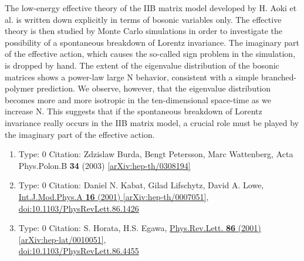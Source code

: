 \documentclass[a4paper,10pt]{article}
\begin{document}
\begin{enumerate}
The low-energy effective theory of the IIB matrix model developed by H. Aoki et al. is written down explicitly in terms of bosonic variables only. The effective theory is then studied by Monte Carlo simulations in order to investigate the possibility of a spontaneous breakdown of Lorentz invariance. The imaginary part of the effective action, which causes the so-called sign problem in the simulation, is dropped by hand. The extent of the eigenvalue distribution of the bosonic matrices shows a power-law large N behavior, consistent with a simple branched-polymer prediction. We observe, however, that the eigenvalue distribution becomes more and more isotropic in the ten-dimensional space-time as we increase N. This suggests that if the spontaneous breakdown of Lorentz invariance really occurs in the IIB matrix model, a crucial role must be played by the imaginary part of the effective action.
\begin{enumerate}
  \item Type: 0 Citation: Zdzislaw Burda, Bengt Petersson, Marc Wattenberg, Acta Phys.Polon.B {\bf 34} (2003)   \href{https://arxiv.org/abs/hep-th/0308194}{[arXiv:hep-th/0308194]}
  \item Type: 0 Citation: Daniel N. Kabat, Gilad Lifschytz, David A. Lowe, \href{https://www.doi.org/10.1103/PhysRevLett.86.1426}{Int.J.Mod.Phys.A {\bf 16} (2001) }  \href{https://arxiv.org/abs/hep-th/0007051}{[arXiv:hep-th/0007051]},\\\href{https://www.doi.org/10.1103/PhysRevLett.86.1426}{doi:10.1103/PhysRevLett.86.1426}
  \item Type: 0 Citation: S. Horata, H.S. Egawa, \href{https://www.doi.org/10.1103/PhysRevLett.86.4455}{Phys.Rev.Lett. {\bf 86} (2001) }  \href{https://arxiv.org/abs/hep-lat/0010051}{[arXiv:hep-lat/0010051]},\\\href{https://www.doi.org/10.1103/PhysRevLett.86.4455}{doi:10.1103/PhysRevLett.86.4455}

\end{enumerate}
\end{enumerate}
\end{document}
